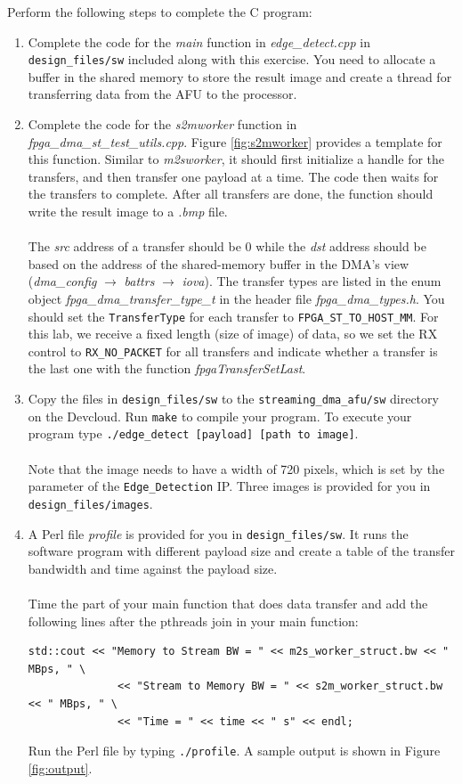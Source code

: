 \documentclass[epsfig,10pt,fullpage]{article}
\begin{document}
\noindent
Perform the following steps to complete the C program: 
\begin{enumerate}
    \item Complete the code for the {\it main} function in {\it edge\_detect.cpp} in \texttt{design\_files/sw} included along with this exercise. You need to allocate a buffer in the shared memory to store the result image and create a thread for transferring data from the AFU to the processor.
    
    \item Complete the code for the {\it s2mworker} function in {\it fpga\_dma\_st\_test\_utils.cpp}. Figure \ref{fig:s2mworker} provides a template for this function. Similar to {\it m2sworker}, it should first initialize a handle for the transfers, and then transfer one payload at a time. The code then waits for the transfers to complete. After all transfers are done, the function should write the result image to a {\it .bmp} file.\\
    \\
    The {\it src} address of a transfer should be 0 while the {\it dst} address should be based on the address of the shared-memory buffer in the DMA's view ({\it dma\_config} $\rightarrow$ {\it battrs} $\rightarrow$ {\it iova}). The transfer types are listed in the enum object {\it fpga\_dma\_transfer\_type\_t} in the header file {\it fpga\_dma\_types.h}. You should set the \texttt{TransferType} for each transfer to \verb|FPGA_ST_TO_HOST_MM|. For this lab, we receive a fixed length (size of image) of data, so we set the RX control to \verb|RX_NO_PACKET| for all transfers and indicate whether a transfer is the last one with the function {\it fpgaTransferSetLast}.
    \item Copy the files in \texttt{design\_files/sw} to the \texttt{streaming\_dma\_afu/sw} directory on the Devcloud. Run \verb|make| to compile your program. To execute your program type \verb|./edge_detect [payload] [path to image]|.\\
    \\
    Note that the image needs to have a width of 720 pixels, which is set by the parameter of the \texttt{Edge\_Detection} IP. Three images is provided for you in \texttt{design\_files/images}.
    
    \item A Perl file {\it profile} is provided for you in \verb|design_files/sw|. It runs the software program with different payload size and create a table of the transfer bandwidth and time against the payload size.\\
    \\
    Time the part of your main function that does data transfer and add the following lines after the pthreads join in your main function:
\lstset{language=C, numbers=none, escapechar=|}
\begin{lstlisting}
std::cout << "Memory to Stream BW = " << m2s_worker_struct.bw << " MBps, " \
			  << "Stream to Memory BW = " << s2m_worker_struct.bw << " MBps, " \
			  << "Time = " << time << " s" << endl;
\end{lstlisting}
    Run the Perl file by typing \verb|./profile|. A sample output is shown in Figure \ref{fig:output}.


\end{enumerate}
\end{document}
